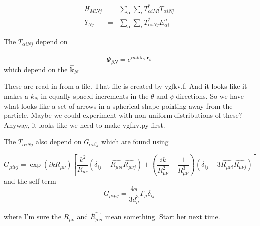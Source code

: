 \documentclass{article}
\begin{document}
\begin{eqnarray}
H_{MlNj} &=&\sum_{\alpha }\sum_{i}T_{\alpha iMl}^{\ast }T_{\alpha iNj}
\label{HTYT} \\
Y_{Nj} &=&\sum_{\alpha }\sum_{i}T_{\alpha iNj}^{\ast }E_{\alpha i}^{o} 
\nonumber
\end{eqnarray}

The $T_{\alpha iNj}$ depend on

\begin{equation}
\Psi _{\beta N}=e^{imk\mathbf{\hat{k}}_{N}\mathbf{\cdot r}_{\beta }}
\end{equation}%
which depend on the $\mathbf{\hat{k}}_{N}$

These are read in from a file. That file is created by vgfkv.f. And it looks
like it makes a $k_{N}$ in equally spaced increments in the $\theta $ and $%
\phi $ directions. So we have what looks like a set
of arrows in a spherical shape pointing away from the particle. Maybe we
could experiment with non-uniform distributions of these? Anyway, it looks
like we need to make vgfkv.py first.

The $T_{\alpha iNj}$ also depend on $G_{\alpha i\beta j}$ which are found
using

\begin{equation}
G_{\mu i\nu j}=\exp (ikR_{\mu \nu })\left[ \frac{k^{2}}{R_{\mu \nu }}\left(
\delta _{ij}-\widehat{R_{\mu \nu i}}\widehat{R_{\mu \nu j}}\right) +\left( 
\frac{ik}{R_{\mu \nu }^{2}}-\frac{1}{R_{\mu \nu }^{3}}\right) \left( \delta
_{ij}-3\widehat{R_{\mu \nu i}}\widehat{R_{\mu \nu j}}\right) \right] 
\end{equation}%
and the self term 
\begin{equation}
G_{\mu i\mu j}=\frac{4\pi }{3d_{\mu }^{3}}\Gamma _{\mu }\delta _{ij}
\label{Guiui}
\end{equation}

where I'm sure the $R_{\mu \nu }$ and $\widehat{R_{\mu \nu i}}$ mean
something. Start her next time.
\end{document}
